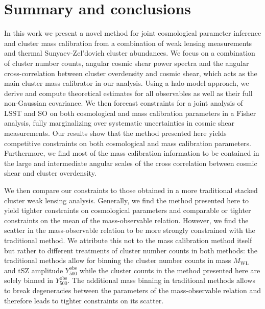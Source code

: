 \documentclass[%
 reprint,
nofootinbib,
 amsmath,amssymb,
 aps,
]{revtex4-1}
\begin{document}
\section{Summary and conclusions}\label{sec:conclusions}

In this work we present a novel method for joint cosmological parameter inference and cluster mass calibration from a combination of weak lensing measurements and thermal Sunyaev-Zel'dovich cluster abundances. We focus on a combination of cluster number counts, angular cosmic shear power spectra and the angular cross-correlation between cluster overdensity and cosmic shear, which acts as the main cluster mass calibrator in our analysis. Using a halo model approach, we derive and compute theoretical estimates for all observables as well as their full non-Gaussian covariance. We then forecast constraints for a joint analysis of LSST and SO on both cosmological and mass calibration parameters in a Fisher analysis, fully marginalizing over systematic uncertainties in cosmic shear measurements. Our results show that the method presented here yields competitive constraints on both cosmological and mass calibration parameters. Furthermore, we find most of the mass calibration information to be contained in the large and intermediate angular scales of the cross correlation between cosmic shear and cluster overdensity.   

We then compare our constraints to those obtained in a more traditional stacked cluster weak lensing analysis. Generally, we find the method presented here to yield tighter constraints on cosmological parameters and comparable or tighter constraints on the mean of the mass-observable relation. However, we find the scatter in the mass-observable relation to be more strongly constrained with the traditional method. We attribute this not to the mass calibration method itself but rather to different treatments of cluster number counts in both methods: the traditional methods allow for binning the cluster number counts in mass $M_{\mathrm{WL}}$ and tSZ amplitude $Y^{\mathrm{obs}}_{500}$ while the cluster counts in the method presented here are solely binned in $Y^{\mathrm{obs}}_{500}$. The additional mass binning in traditional methods allows to break degeneracies between the parameters of the mass-observable relation and therefore leads to tighter constraints on its scatter. 
\end{document}
